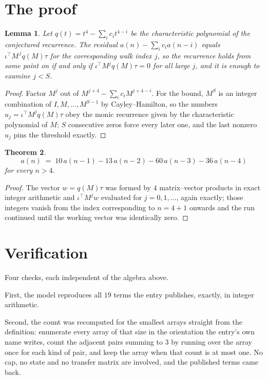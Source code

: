 \documentclass[11pt,a4paper]{article}
\theoremstyle{plain}
\newtheorem{theorem}{Theorem}
\newtheorem{lemma}[theorem]{Lemma}
\theoremstyle{definition}
\begin{document}
\section{The proof}

\begin{lemma}\label{lem:crit}
Let $q(t)=t^{4}-\sum_i c_it^{4-i}$ be the characteristic polynomial of the
conjectured recurrence. The residual $a(n)-\sum_ic_ia(n-i)$ equals
$\iota^{\!\top}M^{\,j}q(M)\tau$ for the corresponding walk index $j$, so the recurrence
holds from some point on if and only if $\iota^{\!\top}M^{j}q(M)\tau=0$ for all large $j$,
and it is enough to examine $j<S$.
\end{lemma}

\begin{proof}
Factor $M^{j}$ out of $M^{j+4}-\sum_ic_iM^{j+4-i}$. For the bound, $M^{S}$
is an integer combination of $I,M,\dots,M^{S-1}$ by Cayley--Hamilton, so the numbers
$u_j=\iota^{\!\top}M^{j}q(M)\tau$ obey the monic recurrence given by the characteristic
polynomial of $M$; $S$ consecutive zeros force every later one, and the last nonzero $u_j$
pins the threshold exactly.
\end{proof}

\begin{theorem}
\[
a(n)\;=\;10\,a(n-1) - 13\,a(n-2) - 60\,a(n-3) - 36\,a(n-4)
\]
for every $n>4$.
\end{theorem}

\begin{proof}
The vector $w=q(M)\tau$ was formed by $4$ matrix--vector products in exact integer
arithmetic and $\iota^{\!\top}M^{j}w$ evaluated for $j=0,1,\dots$, again exactly; those
integers vanish from the index corresponding to $n=4+1$ onwards and the run continued
until the working vector was identically zero.
\end{proof}

\section{Verification}

Four checks, each independent of the algebra above.

First, the model reproduces all $19$ terms the entry publishes, exactly, in integer
arithmetic.

Second, the count was recomputed for the smallest arrays straight from the definition:
enumerate every array of that size in the orientation the entry's own name writes, count the
adjacent pairs summing to $3$ by running over the array once for each kind of pair, and keep
the array when that count is at most one. No cap, no state and no transfer matrix are involved, and
the published terms came back.
\end{document}
